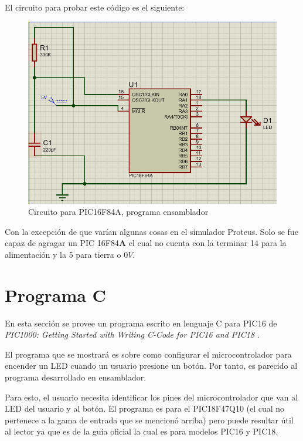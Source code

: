 \documentclass[conference]{IEEEtran}
\begin{document}
    El circuito para probar este código es el siguiente:

    \bigbreak

    \begin{figure}[H]
        \centering
        \includegraphics[width=0.3\paperwidth]{images/pic16f84a-assembly-sim.png}
        \caption{Circuito para PIC16F84A, programa ensamblador}
    \end{figure}

    \bigbreak

    Con la excepción de que varían algunas cosas en el simulador Proteus. Solo se fue capaz de agragar un PIC 16F84\textbf{A} el cual no cuenta con la terminar 14 para la alimentación y la 5 para tierra o $0V$.

    \section{Programa C}

    En esta sección se provee un programa escrito en lenguaje C para PIC16 de \textit{PIC1000: Getting Started with Writing C-Code for PIC16 and PIC18} \cite{microchip-c-program-2020}.

    \bigbreak

    El programa que se mostrará es sobre como configurar el microcontrolador para encender un LED cuando un usuario presione un botón. Por tanto, es parecido al programa desarrollado en ensamblador.

    \bigbreak

    Para esto, el usuario necesita identificar los pines del microcontrolador que van al LED del usuario y al botón. El programa es para el PIC18F47Q10 (el cual no pertenece a la gama de entrada que se mencionó arriba) pero puede resultar útil al lector ya que es de la guía oficial la cual es para modelos PIC16 y PIC18.
\end{document}
